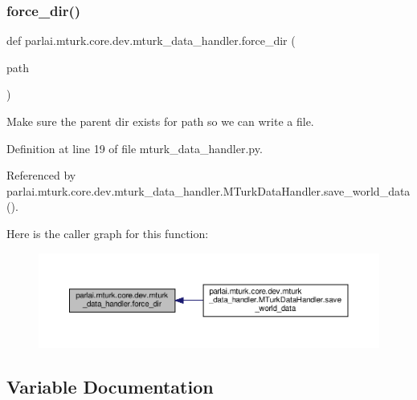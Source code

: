 \subsubsection{\texorpdfstring{force\+\_\+dir()}{force\_dir()}}
{\footnotesize\ttfamily def parlai.\+mturk.\+core.\+dev.\+mturk\+\_\+data\+\_\+handler.\+force\+\_\+dir (\begin{DoxyParamCaption}\item[{}]{path }\end{DoxyParamCaption})}

\begin{DoxyVerb}Make sure the parent dir exists for path so we can write a file.\end{DoxyVerb}
 

Definition at line 19 of file mturk\+\_\+data\+\_\+handler.\+py.



Referenced by parlai.\+mturk.\+core.\+dev.\+mturk\+\_\+data\+\_\+handler.\+M\+Turk\+Data\+Handler.\+save\+\_\+world\+\_\+data().

Here is the caller graph for this function\+:
\nopagebreak
\begin{figure}[H]
\begin{center}
\leavevmode
\includegraphics[width=350pt]{namespaceparlai_1_1mturk_1_1core_1_1dev_1_1mturk__data__handler_a91afc0627fc6e88d49e71f4471fb56b8_icgraph}
\end{center}
\end{figure}


\subsection{Variable Documentation}
\mbox{\label{namespaceparlai_1_1mturk_1_1core_1_1dev_1_1mturk__data__handler_a2250838eb6ae34a406c24cc68de3db25}} 
